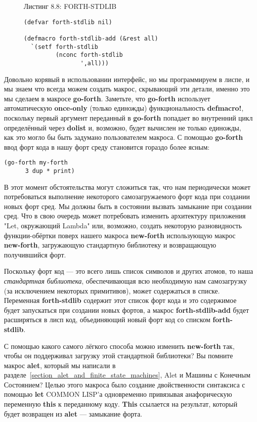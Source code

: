 \begin{figure}Листинг 8.8: FORTH-STDLIB\label{listing_8.8}
\listbegin
\begin{verbatim}
(defvar forth-stdlib nil)

(defmacro forth-stdlib-add (&rest all)
  `(setf forth-stdlib
         (nconc forth-stdlib
                ',all)))
\end{verbatim}
  \listend
\end{figure}

Довольно корявый в использовании интерфейс, но мы программируем в лиспе, и мы знаем что всегда можем создать макрос, скрывающий эти детали, именно это мы сделаем в макросе \textbf{go-forth}. Заметьте, что \textbf{go-forth} использует автоматическую \textbf{once-only} (только единожды) функциональность \textbf{defmacro!}, поскольку первый аргумент переданный в \textbf{go-forth} попадает во внутренний цикл определённый через \textbf{dolist} и, возможно, будет вычислен не только единожды, как это могло бы быть задумано пользователем макроса. С помощью \textbf{go-forth} ввод форт кода в нашу форт среду становится гораздо более ясным:

\begin{verbatim}
(go-forth my-forth
	  3 dup * print)
\end{verbatim}

В этот момент обстоятельства могут сложиться так, что нам периодически может потребоваться выполнение некоторого самозагружаемого форт кода при создании новых форт сред. Мы должны быть в состоянии вызвать замыкание при создании сред. Что в свою очередь может потребовать изменить архитектуру приложения "Let, окружающий Lambda" или, возможно, создать некоторую разновидность функ\-ции-обёрт\-ки поверх нашего макроса \textbf{new-forth} использующую макрос \textbf{new-forth}, загружающую стандартную библиотеку и возвращающую получившийся форт.

Поскольку форт код --- это всего лишь список символов и других атомов, то наша \emph{стандартная библиотека}, обеспечивающая всю необходимую нам самозагрузку (за исключением некоторых примитивов), может содержаться в списке. Переменная \textbf{forth-stdlib} содержит этот список форт кода и это содержимое будет запускаться при создании новых фортов, а макрос \textbf{forth-stdlib-add} будет расширяться в лисп код, объединяющий новый форт код со списком \textbf{forth-stdlib}.

С помощью какого самого лёгкого способа можно изменить \textbf{new-forth} так, чтобы он поддерживал загрузку этой стандартной библиотеки? Вы помните макрос \textbf{alet}, который мы написали в разделе~\ref{section_alet_and_finite_state_machines}, Alet и Машины с Конечным Состоянием? Целью этого макроса было создание двойственности синтаксиса с помощью \textbf{let} COMMON LISP'а одновременно привязывая анафорическую переменную \textbf{this} к переданному коду. \textbf{This} ссылается на результат, который будет возвращен из \textbf{alet} --- замыкание форта.

